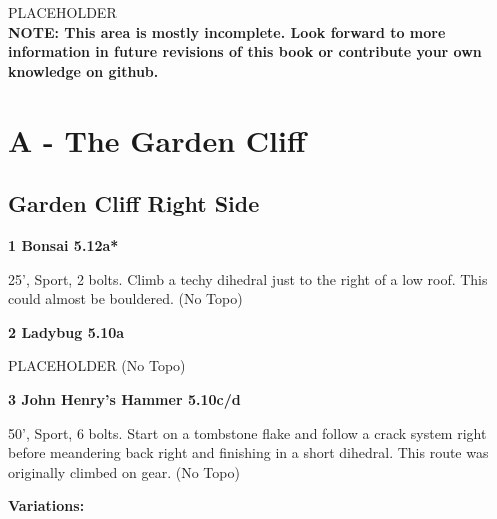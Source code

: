 \begin{multicols}{2}



PLACEHOLDER\\

\textbf{NOTE: This area is mostly incomplete. Look forward to more information in future revisions of this book or contribute your own knowledge on github.}\\


\newpage

\section{A - The Garden Cliff}\label{sa:The Garden Cliff}




\needspace{1.5cm}
\subsection*{Garden Cliff Right Side}\label{bf:Garden Cliff Right Side}
	


\needspace{1.5cm}
\label{rt:Bonsai}
\colorbox{Goldenrod!20}{
\parbox{0.95\linewidth}{
\textbf{
1 Bonsai 5.12a*  
}}}
\begin{adjustwidth}{0.5cm}{}			
25', Sport, 2 bolts. Climb a techy dihedral just to the right of a low roof. This could almost be bouldered.
  (No Topo)
\end{adjustwidth}




\needspace{1.5cm}
\label{rt:Ladybug}
\colorbox{RoyalBlue!20}{
\parbox{0.95\linewidth}{
\textbf{
2 Ladybug 5.10a  
}}}
\begin{adjustwidth}{0.5cm}{}			
PLACEHOLDER
  (No Topo)
\end{adjustwidth}




\needspace{1.5cm}
\label{rt:John Henry's Hammer}
\colorbox{RoyalBlue!20}{
\parbox{0.95\linewidth}{
\textbf{
3 John Henry's Hammer 5.10c/d  
}}}
\begin{adjustwidth}{0.5cm}{}			
50', Sport, 6 bolts. Start on a tombstone flake and follow a crack system right before meandering back right and finishing in a short dihedral. This route was originally climbed on gear.
  (No Topo)
\end{adjustwidth}


\begin{adjustwidth}{0.5cm}{}				
\needspace{3cm}
\textbf{Variations:} \newline


\end{adjustwidth}
\end{multicols}
